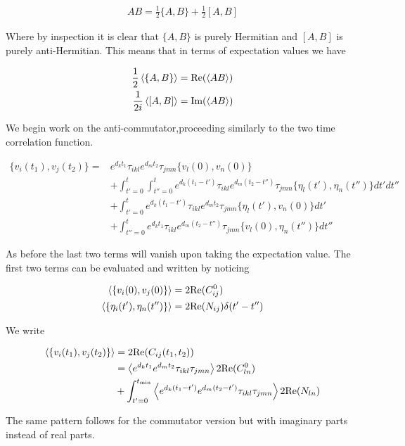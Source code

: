 \documentclass[12pt]{article}
\begin{document}
\begin{align}
AB = \frac{1}{2}\{A,B\} + \frac{1}{2}[A,B]
\end{align}

Where by inspection it is clear that $\{A,B\}$ is purely Hermitian and $[A,B]$ is purely anti-Hermitian. This means that in terms of expectation values we have

\begin{align}
\frac{1}{2}\Braket{\{A,B\}} &= \text{Re}(\Braket{AB})\\
\frac{1}{2i}\Braket{[A,B]} &= \text{Im}(\Braket{AB})
\end{align}

We begin work on the anti-commutator,proceeding similarly to the two time correlation function.

\begin{align}
\{v_i(t_1),v_j(t_2)\} = &e^{d_k t_1}\tau_{ikl} e^{d_m t_2}\tau_{jmn}\{v_l(0),v_{n}(0)\}\\
&+\int_{t'=0}^t \int_{t''=0}^t e^{d_k (t_1-t')}\tau_{ikl} e^{d_m (t_2-t'')}\tau_{jmn}\{\eta_l(t'),\eta_{n}(t'')\}dt'dt''\\
&+ \int_{t'=0}^t e^{d_k (t_1-t')}\tau_{ikl} e^{d_m t_2}\tau_{jmn}\{\eta_l(t'),v_{n}(0)\} dt'\\
&+ \int_{t''=0}^t e^{d_k t_1}\tau_{ikl} e^{d_m (t_2-t'')}\tau_{jmn}\{v_l(0),\eta_{n}(t'')\}dt''
\end{align}

As before the last two terms will vanish upon taking the expectation value. The first two terms can be evaluated and written by noticing

\begin{align}
\Braket{\{v_i(0),v_j(0)\}} &= 2 \text{Re}(C^0_{ij})\\
\Braket{\{\eta_i(t'),\eta_n(t'')\}} &= 2\text{Re}(N_{ij})\delta(t'-t'')
\end{align}

We write

\begin{align}
\Braket{\{v_i(t_1),v_j(t_2)\}} &= 2 \text{Re}(C_{ij}(t_1,t_2))\\
&= \Braket{e^{d_k t_1} e^{d_m t_2} \tau_{ikl}\tau_{jmn}}2\text{Re}(C^0_{ln})\\ 
&+ \int_{t'=0}^{t_{\text{min}}}  \Braket{e^{d_k (t_1-t')} e^{d_m (t_2-t')} \tau_{ikl}\tau_{jmn}}2\text{Re}(N_{ln})
\end{align}

The same pattern follows for the commutator version but with imaginary parts instead of real parts.
\end{document}
